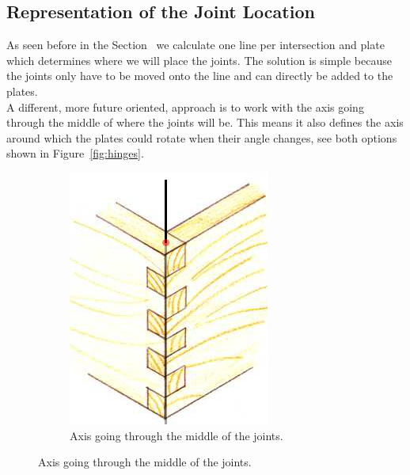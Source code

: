\documentclass[../ClassicThesis.tex]{subfiles}
\begin{document}
\subsection{Representation of the Joint Location}
As seen before in the Section~ we calculate one line per intersection and plate which determines where we will place the joints. The solution is simple because the joints only have to be moved onto the line and can directly be added to the plates. \\
A different, more future oriented, approach is to work with the axis going through the middle of where the joints will be. This means it also defines the axis around which the plates could rotate when their angle changes, see both options shown in Figure~\ref{fig:hinges}. 
\begin{figure}
    \centering
    \begin{subfigure}[b]{0.45\textwidth}
\includegraphics[width=\columnwidth]{Images/woodenFingers.jpg}
\caption{Axis going through the middle of the joints.}
\end{subfigure}

\end{figure}
\end{document}
